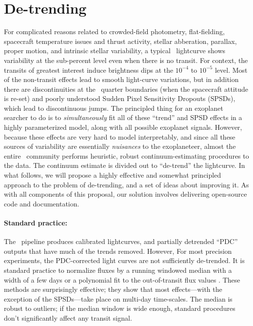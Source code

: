 \documentclass[letterpaper,12pt,preprint]{hack_aastex}
\begin{document}
\section{De-trending}

For complicated reasons related to crowded-field photometry, flat-fielding,
spacecraft temperature issues and thrust activity, stellar abberation, parallax, proper motion,
and intrinsic stellar variability, a typical \Kepler\ lightcurve shows
variability at the sub-percent level even when there is no transit.
For context, the transits of greatest interest induce brightness dips at the
$10^{-4}$ to $10^{-5}$ level.
Most of the non-transit effects lead to smooth light-curve variations, but in addition
there are discontinuities at the \Kepler\ quarter boundaries (when the
spacecraft attitude is re-set) and poorly understood Sudden Pixel
Sensitivity Dropouts (SPSDs), which lead to discontinuous jumps.
The principled thing for an exoplanet searcher to do is to \emph{simultaneously}
fit all of these ``trend'' and SPSD effects in a highly parameterized model,
along with all possible exoplanet signals.
However, because these effects are very hard to model interpretably, and since
all these sources of variability are essentially \emph{nuisances} to the
exoplaneteer, almost the entire \Kepler\ community performs heuristic, robust
continuum-estimating procedures to the data.
The continuum estimate is divided out to ``de-trend'' the lightcurve.
In what follows, we will propose a highly effective and somewhat principled
approach to the problem of de-trending, and a set of ideas about improving it.
As with all components of this proposal, our solution involves delivering
open-source code and documentation.

\paragraph{Standard practice:}
The \Kepler\ pipeline produces calibrated lightcurves, and partially
detrended ``PDC'' outputs that have much of the trends removed.
However, For most precision experiments, the PDC-corrected light curves
are not sufficiently de-trended.
It is standard practice to normalize fluxes by a
running windowed median with a width of a few days \citep{dressing} or a
polynomial fit to the out-of-transit flux values \citep[regions chosen by
hand;][]{autokep}.
These methods are surprisingly effective; they show that most effects---with
the exception of the SPSDs---take place on multi-day time-scales.
The median is robust to outliers; if the median window is
wide enough, standard procedures don't significantly affect any
transit signal.
\end{document}
